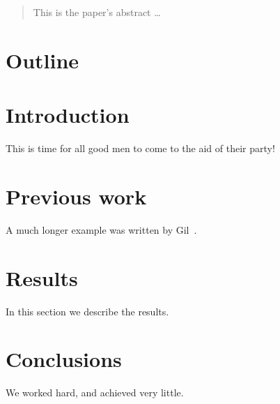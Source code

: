 \documentclass[12pt]{article}
\begin{document}
\maketitle

\begin{abstract}
This is the paper's abstract \ldots
\end{abstract}

\section{Outline}


\section{Introduction}
This is time for all good men to come to the aid of their party!


\section{Previous work}\label{previous work}
A much longer example was written by Gil~\cite{Gil:02}.

\section{Results}\label{results}
In this section we describe the results.

\section{Conclusions}\label{conclusions}
We worked hard, and achieved very little.



\end{document}

